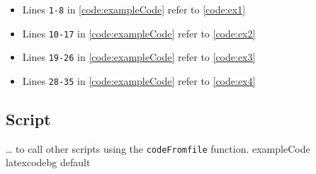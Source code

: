 \documentclass[../Dissertation]{subfiles}
\begin{document}
    \begin{itemize}
        \item Lines \texttt{1-8} in \cref{code:exampleCode} refer to
            \cref{code:ex1}
        \item Lines \texttt{10-17} in \cref{code:exampleCode} refer to
            \cref{code:ex2}
        \item Lines \texttt{19-26} in \cref{code:exampleCode} refer to
            \cref{code:ex3}
        \item Lines \texttt{28-35} in \cref{code:exampleCode} refer to
            \cref{code:ex4}
    \end{itemize}


\subsection{ Script}
    {}
    {\ldots {} to call other scripts using the
     \texttt{codeFromfile} function.} %
    {exampleCode}
    {\footnotesize}
    {latexcodebg}
    {default}
\end{document}
